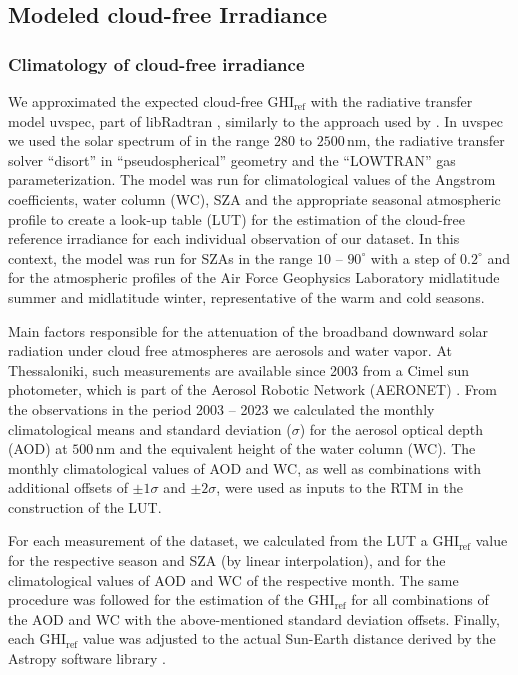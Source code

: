 \documentclass[preprint, 5p,
authoryear]{elsarticle} %
\begin{document}
\hypertarget{rtmcs}{%
\subsection{Modeled cloud-free Irradiance}\label{rtmcs}}

\hypertarget{climatology-of-cloud-free-irradiance}{%
\subsubsection{Climatology of cloud-free
irradiance}\label{climatology-of-cloud-free-irradiance}}

We approximated the expected cloud-free \(\text{GHI}_\text{ref}\) with
the radiative transfer model uvspec, part of libRadtran
\citep{Emde2016}, similarly to the approach used by
\citet{Vamvakas2020}. In uvspec we used the solar spectrum of
\citet{Kurucz1994} in the range \(280\) to \(2500\,\text{nm}\), the
radiative transfer solver ``disort'' in ``pseudospherical'' geometry and
the ``LOWTRAN'' gas parameterization. The model was run for
climatological values of the Angstrom coefficients, water column (WC),
SZA and the appropriate seasonal atmospheric profile to create a look-up
table (LUT) for the estimation of the cloud-free reference irradiance
for each individual observation of our dataset. In this context, the
model was run for SZAs in the range \(10\) -- \(90^\circ\) with a step
of \(0.2^\circ\) and for the atmospheric profiles of the Air Force
Geophysics Laboratory \citep{Anderson1986} midlatitude summer and
midlatitude winter, representative of the warm and cold seasons.

Main factors responsible for the attenuation of the broadband downward
solar radiation under cloud free atmospheres are aerosols and water
vapor. At Thessaloniki, such measurements are available since 2003 from
a Cimel sun photometer, which is part of the Aerosol Robotic Network
(AERONET) \citep{Giles2019, Buis1998}. From the observations in the
period 2003 -- 2023 we calculated the monthly climatological means and
standard deviation (\(\sigma\)) for the aerosol optical depth (AOD) at
\(500\,\text{nm}\) and the equivalent height of the water column (WC).
The monthly climatological values of AOD and WC, as well as combinations
with additional offsets of \(\pm1\sigma\) and \(\pm2\sigma\), were used
as inputs to the RTM in the construction of the LUT.

For each measurement of the dataset, we calculated from the LUT a
\(\text{GHI}_\text{ref}\) value for the respective season and SZA (by
linear interpolation), and for the climatological values of AOD and WC
of the respective month. The same procedure was followed for the
estimation of the \(\text{GHI}_\text{ref}\) for all combinations of the
AOD and WC with the above-mentioned standard deviation offsets. Finally,
each \(\text{GHI}_\text{ref}\) value was adjusted to the actual
Sun-Earth distance derived by the Astropy software library
\citep{AstropyCollaboration2022}.
\end{document}
